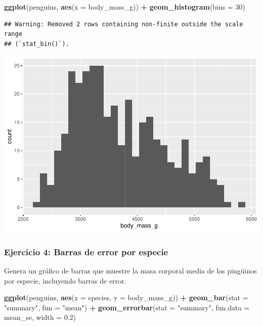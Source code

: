 \documentclass[
]{book}
\newenvironment{Shaded}{\begin{snugshade}}{\end{snugshade}}
\newcommand{\AttributeTok}[1]{\textcolor[rgb]{0.13,0.29,0.53}{#1}}
\newcommand{\DecValTok}[1]{\textcolor[rgb]{0.00,0.00,0.81}{#1}}
\newcommand{\FloatTok}[1]{\textcolor[rgb]{0.00,0.00,0.81}{#1}}
\newcommand{\FunctionTok}[1]{\textcolor[rgb]{0.13,0.29,0.53}{\textbf{#1}}}
\newcommand{\NormalTok}[1]{#1}
\newcommand{\SpecialCharTok}[1]{\textcolor[rgb]{0.81,0.36,0.00}{\textbf{#1}}}
\newcommand{\StringTok}[1]{\textcolor[rgb]{0.31,0.60,0.02}{#1}}
\begin{document}
\begin{Shaded}
\begin{Highlighting}[]
\FunctionTok{ggplot}\NormalTok{(penguins, }\FunctionTok{aes}\NormalTok{(}\AttributeTok{x =}\NormalTok{ body\_mass\_g)) }\SpecialCharTok{+}
  \FunctionTok{geom\_histogram}\NormalTok{(}\AttributeTok{bins =} \DecValTok{30}\NormalTok{)}
\end{Highlighting}
\end{Shaded}

\begin{verbatim}
## Warning: Removed 2 rows containing non-finite outside the scale range
## (`stat_bin()`).
\end{verbatim}

\includegraphics{bookdown-demo_files/figure-latex/unnamed-chunk-185-1.pdf}

\subsubsection{Ejercicio 4: Barras de error por especie}\label{ejercicio-4-barras-de-error-por-especie}

Genera un gráfico de barras que muestre la masa corporal media de los pingüinos por especie, incluyendo barras de error.

\begin{Shaded}
\begin{Highlighting}[]
\FunctionTok{ggplot}\NormalTok{(penguins, }\FunctionTok{aes}\NormalTok{(}\AttributeTok{x =}\NormalTok{ species, }\AttributeTok{y =}\NormalTok{ body\_mass\_g)) }\SpecialCharTok{+}
  \FunctionTok{geom\_bar}\NormalTok{(}\AttributeTok{stat =} \StringTok{"summary"}\NormalTok{, }\AttributeTok{fun =} \StringTok{"mean"}\NormalTok{) }\SpecialCharTok{+}
  \FunctionTok{geom\_errorbar}\NormalTok{(}\AttributeTok{stat =} \StringTok{"summary"}\NormalTok{, }\AttributeTok{fun.data =}\NormalTok{ mean\_se, }\AttributeTok{width =} \FloatTok{0.2}\NormalTok{)}
\end{Highlighting}
\end{Shaded}
\end{document}
